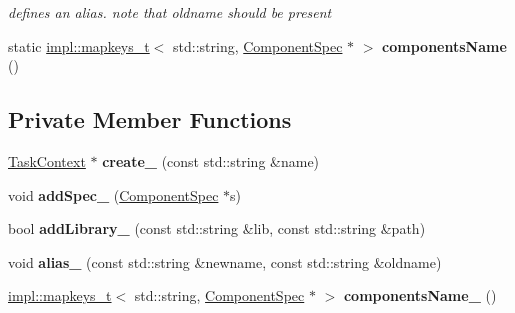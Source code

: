 \begin{DoxyCompactItemize}
\begin{DoxyCompactList}\small\item\em defines an alias. note that oldname should be present \end{DoxyCompactList}\item 
\hypertarget{classcoco_1_1_component_registry_afc132aa37f9fed9933efcf53f1e426d8}{}static \hyperlink{structcoco_1_1impl_1_1mapkeys__t}{impl\+::mapkeys\+\_\+t}$<$ std\+::string, \hyperlink{classcoco_1_1_component_spec}{Component\+Spec} $\ast$ $>$ {\bfseries components\+Name} ()\label{classcoco_1_1_component_registry_afc132aa37f9fed9933efcf53f1e426d8}

\end{DoxyCompactItemize}
\subsection*{Private Member Functions}
\begin{DoxyCompactItemize}
\item 
\hypertarget{classcoco_1_1_component_registry_ad99d750597afcf352900baedb314523f}{}\hyperlink{classcoco_1_1_task_context}{Task\+Context} $\ast$ {\bfseries create\+\_\+} (const std\+::string \&name)\label{classcoco_1_1_component_registry_ad99d750597afcf352900baedb314523f}

\item 
\hypertarget{classcoco_1_1_component_registry_a3a0a94247eecb4a2ebdac0ec559745ff}{}void {\bfseries add\+Spec\+\_\+} (\hyperlink{classcoco_1_1_component_spec}{Component\+Spec} $\ast$s)\label{classcoco_1_1_component_registry_a3a0a94247eecb4a2ebdac0ec559745ff}

\item 
\hypertarget{classcoco_1_1_component_registry_a2f0bcf01b7b47c64a768ebb396b1fc18}{}bool {\bfseries add\+Library\+\_\+} (const std\+::string \&lib, const std\+::string \&path)\label{classcoco_1_1_component_registry_a2f0bcf01b7b47c64a768ebb396b1fc18}

\item 
\hypertarget{classcoco_1_1_component_registry_a03ad04c6c3410862a700eb94704c62b7}{}void {\bfseries alias\+\_\+} (const std\+::string \&newname, const std\+::string \&oldname)\label{classcoco_1_1_component_registry_a03ad04c6c3410862a700eb94704c62b7}

\item 
\hypertarget{classcoco_1_1_component_registry_abbcf913095ad4a072515da1a591fdb15}{}\hyperlink{structcoco_1_1impl_1_1mapkeys__t}{impl\+::mapkeys\+\_\+t}$<$ std\+::string, \hyperlink{classcoco_1_1_component_spec}{Component\+Spec} $\ast$ $>$ {\bfseries components\+Name\+\_\+} ()\label{classcoco_1_1_component_registry_abbcf913095ad4a072515da1a591fdb15}

\end{DoxyCompactItemize}
